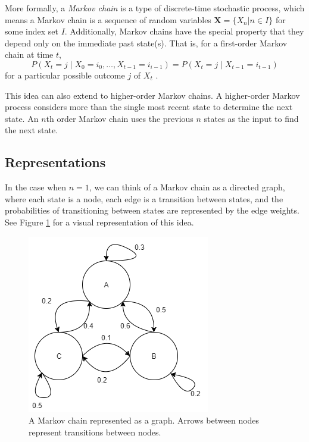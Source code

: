 More formally, a \textit{Markov chain} is a type of discrete-time stochastic process, which means a Markov chain is a sequence of random variables $\boldsymbol{X} = \{X_{n} | n \in I\}$ for some index set $I$.
Additionally, Markov chains have the special property that they depend only on the immediate past state(s).
That is, for a first-order Markov chain at time $t$, $$P(X_{t} = j \mid X_{0} = i_{0}, \ldots, X_{t - 1} = i_{i - 1}) = P(X_{t} = j \mid X_{t - 1} = i_{t - 1})$$ for a particular possible outcome $j$ of $X_{t}$ \cite{nierhaus_algorithmic_2009}.

This idea can also extend to higher-order Markov chains.
A higher-order Markov process considers more than the single most recent state to determine the next state.
An $n$th order Markov chain uses the previous $n$ states as the input to find the next state.

\subsection{Representations} \label{bg:markov:representations}

In the case when $n = 1$, we can think of a Markov chain as a directed graph, where each state is a node, each edge is a transition between states, and the probabilities of transitioning between states are represented by the edge weights.
See Figure \ref{fig:markovGraph} for a visual representation of this idea.

\begin{figure}[h]
	\centering
	\includegraphics[width=\linewidth]{figures/markovGraph.png} %
	\caption[A Markov chain represented as a graph.]{A Markov chain represented as a graph. Arrows between nodes represent transitions between nodes.}
	\label{fig:markovGraph}
\end{figure}

